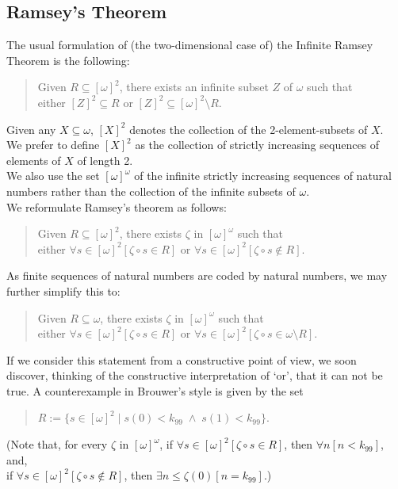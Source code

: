 \documentclass[a4paper]{amsart}
\theoremstyle{plain}
\begin{document}
\subsection{Ramsey's Theorem}\label{SS:ramsey}

The usual formulation of (the two-dimensional case of) the Infinite Ramsey Theorem is the following: 

\begin{quote} Given $R\subseteq [\omega]^2$, there exists an infinite subset $Z$ of $\omega$ such that\\ either $[Z]^2 \subseteq R$ or $[Z]^2\subseteq [\omega]^2\setminus R$. \end{quote}

 Given  any $X\subseteq \omega$, $[X]^2$  denotes the collection of the 2-element-subsets of $X$. 
\\We prefer to define $[X]^2$ as the collection of strictly increasing sequences of elements of $X$ of length 2.
\\We also use the set $[\omega]^\omega$ of the infinite strictly increasing sequences of natural numbers rather than the collection of the infinite subsets of $\omega$. \\We  reformulate Ramsey's theorem as follows: 

\begin{quote} Given $R\subseteq [\omega]^2$, there exists $\zeta$ in $[\omega]^\omega$ such that \\either  $\forall s \in [\omega]^2[\zeta\circ s \in R]$ or $\forall s \in [\omega]^2[\zeta\circ s \notin R]$.  \end{quote}

As finite sequences of natural numbers are coded by natural numbers, we may further simplify this to:

\begin{quote} Given $R\subseteq \omega$, there exists $\zeta$ in $[\omega]^\omega$ such that \\either  $\forall s \in [\omega]^2[\zeta\circ s \in R]$ or $\forall s \in [\omega]^2[\zeta\circ s \in \omega\setminus R]$.  \end{quote}
 
 
 If we consider this statement from a constructive point of view, we soon \\discover, thinking of the constructive interpretation of `or', that it can not be true. A counterexample in Brouwer's style is given by the set \begin{quote} $R:=\{s\in [\omega]^2 \mid s(0)<k_{99} \;\wedge\; s(1) < k_{99}\}$. \end{quote}
 (Note that,  for every $\zeta$ in $[\omega]^\omega$, if $\forall s \in [\omega]^2[\zeta\circ s \in R]$, then $\forall n[n< k_{99}]$, and, \\if $\forall s \in [\omega]^2[\zeta\circ s \notin R]$, then $\exists n\le \zeta(0)[n=k_{99}]$.) 
 
\end{document}
